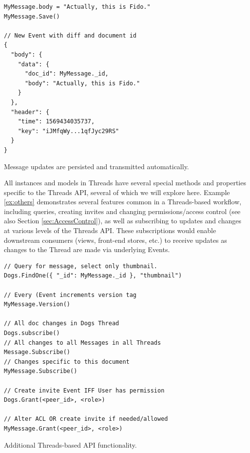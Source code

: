 \documentclass{textile}
\begin{document}
\begin{example}
  \begin{minipage}{.45\textwidth}
    \begin{lstlisting}
MyMessage.body = "Actually, this is Fido."
MyMessage.Save()

// New Event with diff and document id
{
  "body": {
    "data": {
      "doc_id": MyMessage._id,
      "body": "Actually, this is Fido."
    }
  },
  "header": {
    "time": 1569434035737,
    "key": "iJMfqWy...1qfJyc29RS"
  }
}
    \end{lstlisting}
  \end{minipage}
\caption{Message updates are persisted and transmitted automatically.}
\label{ex:updates}
\end{example}

All instances and models in Threads have several special methods and properties specific to the Threads API, several of which we will explore here. Example \ref{ex:others} demonstrates several features common in a Threads-based workflow, including queries, creating invites and changing permissions/access control (see also Section \ref{sec:AccessControl}), as well as subscribing to updates and changes at various levels of the Threads API. These subscriptions would enable downstream consumers (views, front-end stores, etc.) to receive updates as changes to the Thread are made via underlying Events.

\begin{example}
  \begin{minipage}{.45\textwidth}
    \begin{lstlisting}
// Query for message, select only thumbnail.
Dogs.FindOne({ "_id": MyMessage._id }, "thumbnail")

// Every (Event increments version tag
MyMessage.Version()

// All doc changes in Dogs Thread
Dogs.subscribe()
// All changes to all Messages in all Threads
Message.Subscribe() 
// Changes specific to this document
MyMessage.Subscribe() 

// Create invite Event IFF User has permission
Dogs.Grant(<peer_id>, <role>)

// Alter ACL OR create invite if needed/allowed
MyMessage.Grant(<peer_id>, <role>)
    \end{lstlisting}
  \end{minipage}
\caption{Additional Threads-based API functionality.}
\label{ex:others}
\end{example}
\end{document}
